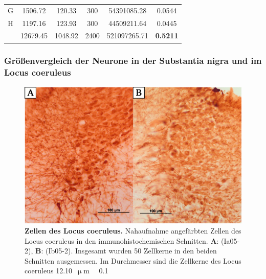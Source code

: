 \documentclass[12pt,a4paper,pdftex]{article}
\newcommand{\rpm}{\raisebox{.2ex}{$\scriptstyle\pm$} }
\begin{document}
\begin{table}[H]
{\begin{tabular}{cccccc}
G                                 & 1506.72                                 & 120.33                                   & 300                                    & 54391085.28                                & 0.0544                                     \\
H                                 & 1197.16                                 & 123.93                                   & 300                                    & 44509211.64                                & 0.0445                                     \\\hline
                                  & 12679.45                                & 1048.92                                  & 2400                                   & 521097265.71                               & \textbf{0.5211}                           
\end{tabular}%
}
\end{table}


\subsubsection{Größenvergleich der Neurone in der Substantia nigra und im Locus coeruleus}

\begin{figure}[H]
    \centering
    \includegraphics{pictures/Bilder_monoamine_systeme/Zellen_LC.png}
    \caption[Zellen des Locus coeruleus]{\textbf{Zellen des Locus coeruleus.} Nahaufnahme angefärbten Zellen des Locus coeruleus in den immunohistochemischen Schnitten. \textbf{A}: (Ia05-2), \textbf{B}: (Ib05-2). Insgesamt wurden 50 Zellkerne in den beiden Schnitten ausgemessen. Im Durchmesser sind die Zellkerne des Locus coeruleus 12.10~$\upmu$m~\rpm~0.1}
    \label{fig:Zellen_LC}
\end{figure}
\end{document}
